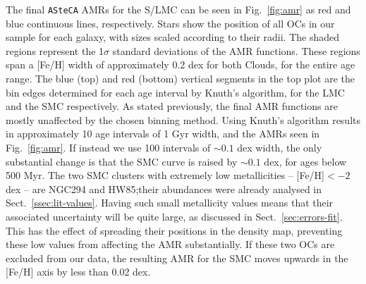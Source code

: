 \documentclass[a4paper,fleqn,usenatbib]{mnras}
\begin{document}
The final \texttt{ASteCA} AMRs for the S/LMC can be seen in Fig.~\ref{fig:amr}
as red and blue continuous lines, respectively. Stars show the position of all
OCs in our sample for each galaxy, with sizes scaled according to their radii.
%
The shaded regions represent the 1$\sigma$ standard deviations of the AMR
functions. These regions span a [Fe/H] width of approximately 0.2 dex for both
Clouds, for the entire age range.
%
The blue (top) and red (bottom) vertical segments in the top plot are the bin
edges determined for each age interval by Knuth's algorithm, for the LMC and the
SMC respectively.
%
As stated previously, the final AMR functions are mostly unaffected by the
chosen binning method. Using Knuth's algorithm results in approximately 10 age
intervals of 1 Gyr width, and the AMRs seen in Fig.~\ref{fig:amr}.
If instead we use 100 intervals of ${\sim}0.1$ dex width, the only substantial
change is that the SMC curve is raised by ${\sim}0.1$ dex, for ages below 500
Myr.
%
The two SMC clusters with extremely low metallicities -- [Fe/H]${<-}2$
dex -- are NGC294 and HW85;\@ their abundances were already analysed in
Sect.~\ref{ssec:lit-values}.
Having such small metallicity values means that their associated uncertainty
will be quite large, as discussed in Sect.~\ref{sec:errors-fit}.
This has the effect of spreading their positions in the density
map, preventing these low values from affecting the AMR substantially.
If these two OCs are excluded from our data, the resulting AMR for the SMC moves
upwards in the [Fe/H] axis by less than 0.02 dex.
\end{document}
